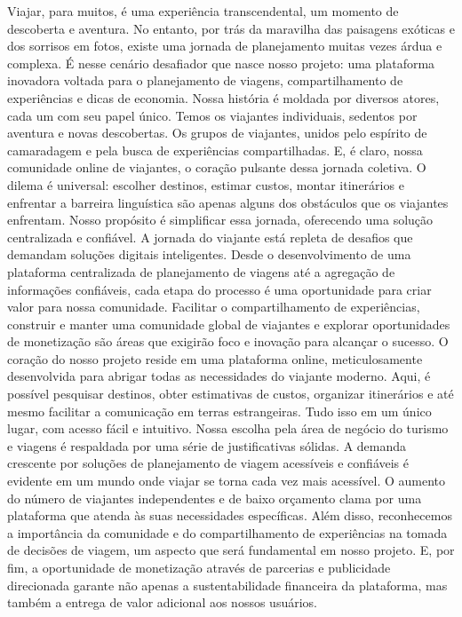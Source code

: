 \documentclass{article}
\begin{document}
Viajar, para muitos, é uma experiência transcendental, um momento de descoberta e aventura. No entanto, por trás da maravilha das paisagens exóticas e dos sorrisos em fotos, existe uma jornada de planejamento muitas vezes árdua e complexa. É nesse cenário desafiador que nasce nosso projeto: uma plataforma inovadora voltada para o planejamento de viagens, compartilhamento de experiências e dicas de economia.
Nossa história é moldada por diversos atores, cada um com seu papel único. Temos os viajantes individuais, sedentos por aventura e novas descobertas. Os grupos de viajantes, unidos pelo espírito de camaradagem e pela busca de experiências compartilhadas. E, é claro, nossa comunidade online de viajantes, o coração pulsante dessa jornada coletiva. O dilema é universal: escolher destinos, estimar custos, montar itinerários e enfrentar a barreira linguística são apenas alguns dos obstáculos que os viajantes enfrentam. Nosso propósito é simplificar essa jornada, oferecendo uma solução centralizada e confiável.
A jornada do viajante está repleta de desafios que demandam soluções digitais inteligentes. Desde o desenvolvimento de uma plataforma centralizada de planejamento de viagens até a agregação de informações confiáveis, cada etapa do processo é uma oportunidade para criar valor para nossa comunidade. Facilitar o compartilhamento de experiências, construir e manter uma comunidade global de viajantes e explorar oportunidades de monetização são áreas que exigirão foco e inovação para alcançar o sucesso. O coração do nosso projeto reside em uma plataforma online, meticulosamente desenvolvida para abrigar todas as necessidades do viajante moderno. Aqui, é possível pesquisar destinos, obter estimativas de custos, organizar itinerários e até mesmo facilitar a comunicação em terras estrangeiras. Tudo isso em um único lugar, com acesso fácil e intuitivo.
Nossa escolha pela área de negócio do turismo e viagens é respaldada por uma série de justificativas sólidas. A demanda crescente por soluções de planejamento de viagem acessíveis e confiáveis é evidente em um mundo onde viajar se torna cada vez mais acessível. O aumento do número de viajantes independentes e de baixo orçamento clama por uma plataforma que atenda às suas necessidades específicas. Além disso, reconhecemos a importância da comunidade e do compartilhamento de experiências na tomada de decisões de viagem, um aspecto que será fundamental em nosso projeto. E, por fim, a oportunidade de monetização através de parcerias e publicidade direcionada garante não apenas a sustentabilidade financeira da plataforma, mas também a entrega de valor adicional aos nossos usuários.
\end{document}
